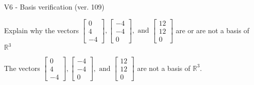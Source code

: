 \begin{exercise}
  \begin{exerciseTitle}V6 - Basis verification (ver. 109)\end{exerciseTitle}
  \begin{exerciseStatement}
    Explain why the vectors \(\left[\begin{array}{r}
0 \\
4 \\
-4
\end{array}\right] , \left[\begin{array}{r}
-4 \\
-4 \\
0
\end{array}\right] , \text{ and } \left[\begin{array}{r}
12 \\
12 \\
0
\end{array}\right]\) are or are not a basis of \(\mathbb{R}^3\)	


  \end{exerciseStatement}
  \begin{exerciseAnswer}
   The vectors \(\left[\begin{array}{r}
0 \\
4 \\
-4
\end{array}\right] , \left[\begin{array}{r}
-4 \\
-4 \\
0
\end{array}\right] , \text{ and } \left[\begin{array}{r}
12 \\
12 \\
0
\end{array}\right]\) 
  	 are not  a basis of \(\mathbb{R}^3\).
  


  \end{exerciseAnswer}
\end{exercise}
